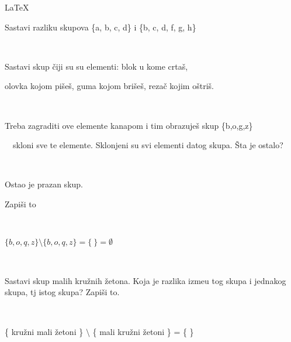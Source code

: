     \LaTeX

    \begin{zad}

        Sastavi razliku skupova \{a, b, c, d\} i \{b, c, d, f, g, h\}

        \

    \end{zad}

        

    \begin{zad}

        Sastavi skup \v ciji su su elementi: blok u kome crta\v s,

        olovka kojom pi\v se\v s, guma kojom bri\v se\v s, reza\v c kojim o\v stri\v s.

        \

        

        Treba zagraditi ove elemente kanapom i tim obrazuje\v s skup \{b,o,g,z\} 

        \ \ skloni sve te elemente. Sklonjeni su svi elementi datog skupa. \v Sta je ostalo?

        \

        

        Ostao je prazan skup.

        Zapi\v si to

        \ 

        

        $\{b, o, q, z\} \setminus \{b, o, q, z\} = \{ \ \} =

        \emptyset$

        \ 

    \end{zad}

    \begin{zad}

        Sastavi skup malih kru\v znih \v zetona. Koja je razlika izme\dj u tog skupa i jednakog skupa, tj istog skupa? Zapi\v si to.

        \ 

        

        \{ kru\v zni mali  \v zetoni \} $\setminus$ \{ mali kru\v zni \v zetoni \} = \{  \}

        \ 

    \end{zad}

